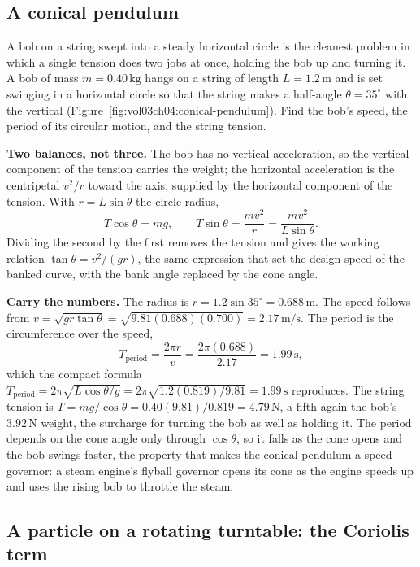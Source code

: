 \subsection{A conical pendulum}

A bob on a string swept into a steady horizontal circle is the cleanest
problem in which a single tension does two jobs at once, holding the bob
up and turning it. A bob of mass $m=0.40\,\si{\kilogram}$ hangs on a
string of length $L=1.2\,\si{\meter}$ and is set swinging in a
horizontal circle so that the string makes a half-angle $\theta=
35^{\circ}$ with the vertical (Figure~\ref{fig:vol03ch04:conical-pendulum}).
Find the bob's speed, the period of its circular motion, and the string
tension.

\textbf{Two balances, not three.} The bob has no vertical acceleration,
so the vertical component of the tension carries the weight; the
horizontal acceleration is the centripetal $v^{2}/r$ toward the axis,
supplied by the horizontal component of the tension. With $r=L\sin
\theta$ the circle radius,
\[
T\cos\theta=mg, \qquad T\sin\theta=\frac{m v^{2}}{r}=\frac{m v^{2}}
{L\sin\theta}.
\]
Dividing the second by the first removes the tension and gives the
working relation $\tan\theta=v^{2}/(gr)$, the same expression that set
the design speed of the banked curve, with the bank angle replaced by
the cone angle.

\textbf{Carry the numbers.} The radius is $r=1.2\sin 35^{\circ}=0.688
\,\si{\meter}$. The speed follows from $v=\sqrt{gr\tan\theta}=\sqrt{9.81
(0.688)(0.700)}=2.17\,\si{\meter\per\second}$. The period is the
circumference over the speed,
\[
T_{\text{period}}=\frac{2\pi r}{v}=\frac{2\pi(0.688)}{2.17}=1.99\,\si{
\second},
\]
which the compact formula $T_{\text{period}}=2\pi\sqrt{L\cos\theta/g}=
2\pi\sqrt{1.2(0.819)/9.81}=1.99\,\si{\second}$ reproduces. The string
tension is $T=mg/\cos\theta=0.40(9.81)/0.819=4.79\,\si{\newton}$, a fifth
again the bob's $3.92\,\si{\newton}$ weight, the surcharge for turning
the bob as well as holding it. The period depends on the cone angle
only through $\cos\theta$, so it falls as the cone opens and the bob
swings faster, the property that makes the conical pendulum a speed
governor: a steam engine's flyball governor opens its cone as the
engine speeds up and uses the rising bob to throttle the steam.

\subsection{A particle on a rotating turntable: the Coriolis term}

